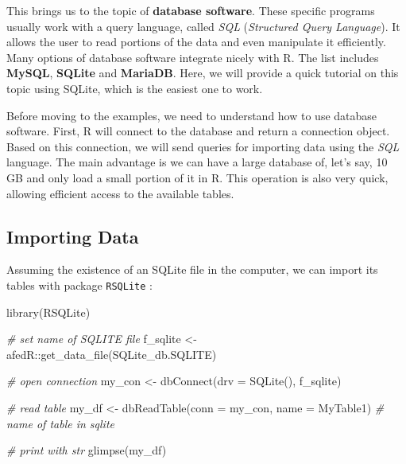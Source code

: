 \documentclass[
  12pt,
]{book}
\newenvironment{Shaded}{\begin{snugshade}}{\end{snugshade}}
\newcommand{\AttributeTok}[1]{\textcolor[rgb]{0.61,0.61,0.61}{#1}}
\newcommand{\CommentTok}[1]{\textcolor[rgb]{0.37,0.37,0.37}{\textit{#1}}}
\newcommand{\FunctionTok}[1]{\textcolor[rgb]{0,0,0}{#1}}
\newcommand{\NormalTok}[1]{#1}
\newcommand{\OtherTok}[1]{\textcolor[rgb]{0.37,0.37,0.37}{#1}}
\newcommand{\SpecialCharTok}[1]{\textcolor[rgb]{0,0,0}{#1}}
\newcommand{\StringTok}[1]{\textcolor[rgb]{0.5,0.5,0.5}{#1}}
\begin{document}
This brings us to the topic of \textbf{database software}. These specific programs usually work with a query language, called \emph{SQL} (\emph{Structured Query Language}). It allows the user to read portions of the data and even manipulate it efficiently. Many options of database software integrate nicely with R. The list includes \textbf{MySQL}, \textbf{SQLite} and \textbf{MariaDB}. Here, we will provide a quick tutorial on this topic using SQLite, which is the easiest one to work.   

Before moving to the examples, we need to understand how to use database software. First, R will connect to the database and return a connection object. Based on this connection, we will send queries for importing data using the \emph{SQL} language. The main advantage is we can have a large database of, let's say, 10 GB and only load a small portion of it in R. This operation is also very quick, allowing efficient access to the available tables.

\hypertarget{importing-data-4}{%
\subsection{Importing Data}\label{importing-data-4}}

Assuming the existence of an SQLite file in the computer, we can import its tables with package \texttt{RSQLite} \citep{R-RSQLite}:

\begin{Shaded}
\begin{Highlighting}[]
\FunctionTok{library}\NormalTok{(RSQLite)}

\CommentTok{\# set name of SQLITE file}
\NormalTok{f\_sqlite }\OtherTok{\textless{}{-}}\NormalTok{ afedR}\SpecialCharTok{::}\FunctionTok{get\_data\_file}\NormalTok{(}\StringTok{\textquotesingle{}SQLite\_db.SQLITE\textquotesingle{}}\NormalTok{)}

\CommentTok{\# open connection}
\NormalTok{my\_con }\OtherTok{\textless{}{-}} \FunctionTok{dbConnect}\NormalTok{(}\AttributeTok{drv =} \FunctionTok{SQLite}\NormalTok{(), f\_sqlite)}

\CommentTok{\# read table}
\NormalTok{my\_df }\OtherTok{\textless{}{-}} \FunctionTok{dbReadTable}\NormalTok{(}\AttributeTok{conn =}\NormalTok{ my\_con,}
                     \AttributeTok{name =} \StringTok{\textquotesingle{}MyTable1\textquotesingle{}}\NormalTok{) }\CommentTok{\# name of table in sqlite}

\CommentTok{\# print with str}
\FunctionTok{glimpse}\NormalTok{(my\_df)}
\end{Highlighting}
\end{Shaded}
\end{document}
